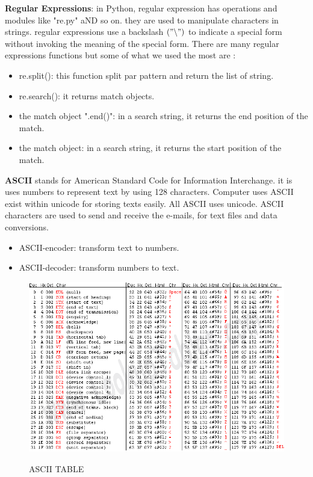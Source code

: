 \begin{itemize}
\textbf{Regular Expressions}: in Python, regular expression has operations and modules like "re.py" aND so on. they are used to manipulate characters in strings. regular expressions use a backslash $(" \backslash  ")$  to indicate a special form without invoking the meaning of the special form. There are many regular expressions functions but some of what we used the most are :
\begin{itemize}
\item re.split(): this function split par pattern and return the list of string.
\item re.search(): it returns match objects.
\item the match object ".end()": in a search string, it returns the end position of the match.
\item the match object: in a search string, it returns the start position of the match.
\end{itemize}

\textbf{ASCII} stands for American Standard Code for Information Interchange. it is uses numbers to represent text by using 128 characters. Computer uses ASCII exist within unicode for storing texts easily. All  ASCII uses unicode. ASCII characters are used to send and receive the e-mails, for text files and data conversions. 


\begin{itemize}
\item  ASCII-encoder: transform text to numbers.
\item  ASCII-decoder: transform numbers to text.
\end{itemize}
\newpage
\begin{figure}[hbtp]
\caption{ASCII TABLE}
\centering
\includegraphics[scale=.5]{images/ASCII.png}\label{ASCII}
\end{figure}
\end{itemize}

